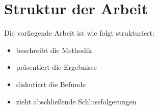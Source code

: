 \section{Struktur der Arbeit}
\label{sec:intro:structure}

Die vorliegende Arbeit ist wie folgt strukturiert:
\begin{itemize}
    \item {} beschreibt die Methodik
    \item {} präsentiert die Ergebnisse
    \item {} diskutiert die Befunde
    \item {} zieht abschließende Schlussfolgerungen
\end{itemize}
